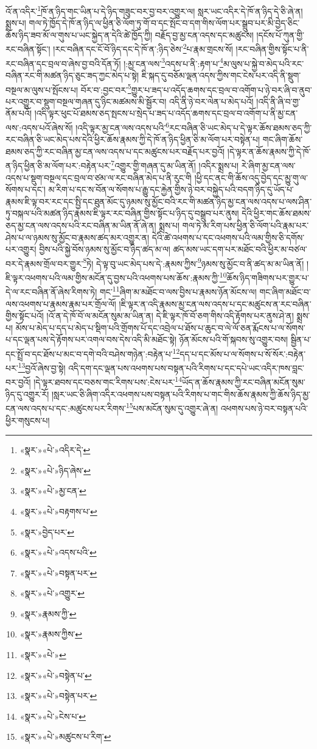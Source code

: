 འོ་ན་འདིར་\footnote{«སྣར་»«པེ་»འདིར་དེ་}ཁོ་ན་ཉིད་གང་ཡིན་པ་དེ་ཉིད་གཟུང་བར་བྱ་བར་འགྱུར་ལ། སླར་ཡང་འདིར་དེ་ཁོ་ན་ཉིད་དེ་ཅི་ཞེ་ན། སྨྲས་པ། གལ་ཏེ་ཁྱོད་དེ་ཁོ་ན་ཉིད་ལ་ཕྱིན་ཅི་ལོག་ཏུ་གོ་བ་དང་སྤོང་བ་དག་གིས་ལོག་པར་སྒྲུབ་པར་མི་བྱེད་ཅིང་ཆོས་ཉིད་ཟབ་མོ་ལ་གུས་པ་ཡང་སྐྱེད་ན་དེའི་ཚེ་ཁྱོད་ཀྱི། བརྗོད་བྱ་མྱ་ངན་འདས་དང་མཚུངས། །དངོས་པོ་ཀུན་གྱི་རང་བཞིན་སྟོང་། །རང་བཞིན་དང་ངོ་བོ་ཉིད་དང་དེ་ཁོ་ན་:ཉིད་ཅེས་\footnote{«སྣར་»«པེ་»ཉིད་ཞེས་}པ་རྣམ་གྲངས་སོ། །རང་བཞིན་གྱིས་སྟོང་པ་ནི་རང་བཞིན་དང་བྲལ་བ་ཞེས་བྱ་བའི་དོན་ཏོ། །:མྱ་ངན་ལས་\footnote{«སྣར་»«པེ་»མྱ་ངན་}འདས་པ་ནི་:རྟག་པ་\footnote{«སྣར་»«པེ་»བརྟགས་པ་}མ་ལུས་པ་སྐྱེ་བ་མེད་པའི་རང་བཞིན་རང་གི་མཚན་ཉིད་ཅུང་ཟད་ཀྱང་མེད་པ་སྟེ། ཇི་སྐད་དུ་བཅོམ་ལྡན་འདས་ཀྱིས་གང་ངེས་པར་འདི་ནི་སྡུག་བསྔལ་མ་ལུས་པ་སྤོངས་པ། བོར་བ་:བྱང་བར་\footnote{«སྣར་»བྱེད་པར་}གྱུར་པ་ཟད་པ་འདོད་ཆགས་དང་བྲལ་བ་འགོག་པ་ཉེ་བར་ཞི་བ་ནུབ་པར་འགྱུར་བ་སྡུག་བསྔལ་གཞན་དུ་ཉིང་མཚམས་མི་སྦྱོར་བ། འདི་ནི་ཉེ་བར་ལེན་པ་མེད་པའོ། །འདི་ནི་ཞི་བ་གྱ་ནོམ་པའོ། །འདི་ལྟར་ཕུང་པོ་ཐམས་ཅད་སྤངས་པ་སྲེད་པ་ཟད་པ་འདོད་ཆགས་དང་བྲལ་བ་འགོག་པ་ནི་མྱ་ངན་ལས་:འདས་པའོ་ཞེས་སོ། །འདི་ལྟར་མྱ་ངན་ལས་འདས་པའི་\footnote{«སྣར་»«པེ་»འདས་པའི་}རང་བཞིན་ཅི་ཡང་མེད་པ་དེ་ལྟར་ཆོས་ཐམས་ཅད་ཀྱི་རང་བཞིན་ཅི་ཡང་མེད་པས་དེའི་ཕྱིར་ཆོས་རྣམས་ཀྱི་དེ་ཁོ་ན་ཉིད་ཕྱིན་ཅི་མ་ལོག་པར་བསྟེན་པ། གང་ཞིག་ཆོས་ཐམས་ཅད་ཀྱི་རང་བཞིན་མྱ་ངན་ལས་འདས་པ་དང་མཚུངས་པར་བརྗོད་པར་བྱའོ། །དེ་ལྟར་ན་ཆོས་རྣམས་ཀྱི་དེ་ཁོ་ན་ཉིད་ཕྱིན་ཅི་མ་ལོག་པར་:བརྟེན་པར་\footnote{«སྣར་»«པེ་»བསྟན་པར་}འགྱུར་གྱི་གཞན་དུ་མ་ཡིན་ནོ། །འདིར་སྨྲས་པ། རེ་ཞིག་མྱ་ངན་ལས་འདས་པ་སྡུག་བསྔལ་དང་བྲལ་བ་ཙམ་ལ་རང་བཞིན་མེད་པ་ནི་རུང་གི །ཕྱི་དང་ནང་གི་ཆོས་འདུ་བྱེད་དང་མྱུ་གུ་ལ་སོགས་པ་དང་། མ་རིག་པ་དང་ས་བོན་ལ་སོགས་པ་རྒྱུ་དང་རྐྱེན་གྱིས་ཉེ་བར་བསྐྱེད་པའི་བདག་ཉིད་དུ་ཡོད་པ་རྣམས་ཇི་ལྟ་བར་རང་དང་སྤྱི་དང་ཐུན་མོང་དུ་ཉམས་སུ་མྱོང་བའི་རང་གི་མཚན་ཉིད་མྱ་ངན་ལས་འདས་པ་ལས་ཤིན་ཏུ་བསྐལ་པའི་མཚན་ཉིད་རྣམས་ཇི་ལྟར་རང་བཞིན་གྱིས་སྟོང་པ་ཉིད་དུ་བསྒྲུབ་པར་ནུས། དེའི་ཕྱིར་གང་ཆོས་ཐམས་ཅད་མྱ་ངན་ལས་འདས་པའི་རང་བཞིན་མ་ཡིན་ནོ་ཞེ་ན། སྨྲས་པ། གལ་ཏེ་མ་རིག་པས་ཕྱིན་ཅི་ལོག་པའི་རྣམ་པར་ཤེས་པ་ལ་ཉམས་སུ་མྱོང་བ་རྣམས་ཚད་མར་འགྱུར་ན། དེའི་ཚེ་འཕགས་པ་དང་འཕགས་པའི་ལམ་གྱིས་ཅི་དགོས་པར་འགྱུར། བྱིས་པའི་སྐྱེ་བོས་ཉམས་སུ་མྱོང་བ་ཉིད་ཚད་མ་ལ། ཚད་མས་ཡང་དག་པར་མཐོང་བའི་ཕྱིར་མ་བཙལ་བར་དེ་རྣམས་གྲོལ་བར་གྱུར་\footnote{«སྣར་»«པེ་»འགྱུར་}ཏེ། དེ་ལྟ་བུ་ཡང་མེད་པས་དེ་:རྣམས་ཀྱིས་\footnote{«སྣར་»རྣམས་ཀྱི་}ཉམས་སུ་མྱོང་བ་ནི་ཚད་མ་མ་ཡིན་ནོ། །ཇི་ལྟར་འཕགས་པའི་ལམ་གྱིས་མངོན་དུ་བྱས་པའི་འཕགས་པས་ཆོས་:རྣམས་ཀྱི་\footnote{«སྣར་»རྣམས་ཀྱིས་}ཆོས་ཉིད་གཟིགས་པར་གྱུར་པ་དེ་ལ་རང་བཞིན་ནོ་ཞེས་རིགས་ཏེ། གང་\footnote{«སྣར་»«པེ་»}ཞིག་མ་མཐོང་བ་ལས་བྱིས་པ་རྣམས་ཉོན་མོངས་ལ། གང་ཞིག་མཐོང་བ་ལས་འཕགས་པ་རྣམས་རྣམ་པར་གྲོལ་ལོ། །ཇི་ལྟར་ན་འདི་རྣམས་མྱ་ངན་ལས་འདས་པ་དང་མཚུངས་ན་རང་བཞིན་གྱིས་སྟོང་པའོ། །འོ་ན་དེ་ཁོ་བོ་ལ་མངོན་སུམ་མ་ཡིན་ན། དེ་ཇི་ལྟར་ཁོ་བོ་ཅག་གིས་འདི་རྟོགས་པར་ནུས་ཤེ་ན། སྨྲས་པ། མོས་པ་མེད་པ་དད་པ་མེད་པ་སྡིག་པའི་གྲོགས་པོ་དང་འབྲེལ་པ་ཐོས་པ་ཆུང་བ་ལེ་ལོ་ཅན་རྨོངས་པ་ལ་སོགས་པ་དང་ལྡན་པས་དེ་རྟོགས་པར་འགལ་བས་དེས་འདི་མི་མཐོང་སྟེ། ཉོན་མོངས་པའི་གོ་སྐབས་སུ་འགྱུར་བས། སྦྱིན་པ་དང་སྤྲོ་བ་དང་ཐོས་པ་མང་བ་དགེ་བའི་བཤེས་གཉེན་:བརྟེན་པ་\footnote{«སྣར་»«པེ་»བསྟེན་པ་}དད་པ་དང་མོས་པ་ལ་སོགས་པ་སོ་སོར་:བརྟེན་པར་\footnote{«སྣར་»«པེ་»བསྟེན་པར་}བྱའོ་ཞེས་བྱ་སྟེ། འདི་དག་དང་ལྡན་པས་འཕགས་པས་བསྟན་པའི་རིགས་པ་དང་དཔེ་ཡང་འདིར་ཁས་བླང་བར་བྱའོ། །དེ་ལྟར་ཐབས་དང་བཅས་གང་རིགས་པས་:ངེས་པར་\footnote{«སྣར་»«པེ་»ངེས་པ་}ཡོད་ན་ཆོས་རྣམས་ཀྱི་རང་བཞིན་མངོན་སུམ་ཉིད་དུ་འགྱུར་རོ། །སླར་ཡང་ཅི་ཞིག་འདིར་འཕགས་པས་བསྟན་པའི་རིགས་པ་གང་གིས་ཆོས་རྣམས་ཀྱི་ཆོས་ཉིད་མྱ་ངན་ལས་འདས་པ་དང་:མཚུངས་པར་རིགས་\footnote{«སྣར་»«པེ་»མཚུངས་པ་རིག་}པས་མངོན་སུམ་དུ་འགྱུར་ཞེ་ན། འཕགས་པས་ཉེ་བར་བསྟན་པའི་ཕྱིར་གསུངས་པ། 